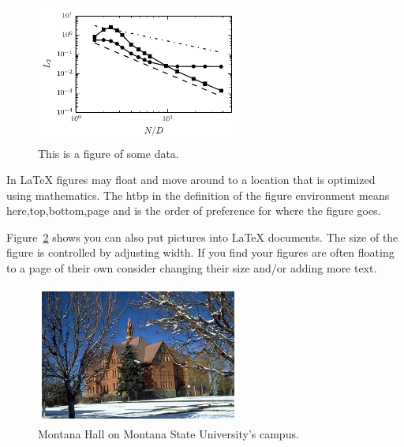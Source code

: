 \begin{figure}[htbp]
  \centering
  \includegraphics[width=0.6\textwidth]{figs/plot.pdf}
  \caption{This is a figure of some data.}
  \label{fig:plot}
\end{figure}

In \LaTeX{} figures may float and move around to a location that is optimized using mathematics. The htbp in the definition of the figure environment means here,top,bottom,page and is the order of preference for where the figure goes.  

Figure~\ref{fig:photo} shows you can also put pictures into \LaTeX{} documents.  The size of the figure is controlled by adjusting width.  If you find your figures are often floating to a page of their own consider changing their size and/or adding more text.

\begin{figure}[htbp]
  \centering
  \includegraphics[width=0.6\textwidth]{figs/MSU.jpg}
  \caption{Montana Hall on Montana State University's campus.}
  \label{fig:photo}
\end{figure}

